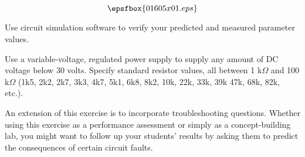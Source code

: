 

$$\epsfbox{01605x01.eps}$$

\vfil \eject






Use circuit simulation software to verify your predicted and measured parameter values.







Use a variable-voltage, regulated power supply to supply any amount of DC voltage below 30 volts.  Specify standard resistor values, all between 1 k$\Omega$ and 100 k$\Omega$ (1k5, 2k2, 2k7, 3k3, 4k7, 5k1, 6k8, 8k2, 10k, 22k, 33k, 39k 47k, 68k, 82k, etc.).

An extension of this exercise is to incorporate troubleshooting questions.  Whether using this exercise as a performance assessment or simply as a concept-building lab, you might want to follow up your students' results by asking them to predict the consequences of certain circuit faults.




